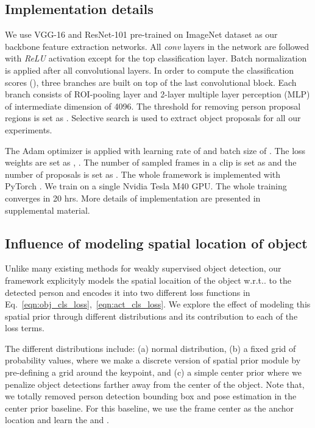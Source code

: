 \documentclass[10pt,twocolumn,letterpaper]{article}
\makeatletter
\DeclareRobustCommand\onedot{\futurelet\@let@token\@onedot}
\def\onedot{\ifx\@let@token.\else.\null\fi\xspace}
\def\wrt{w.r.t\onedot}
\makeatother
\begin{document}
\vspace{-0.4\baselineskip}
\subsection{Implementation details}
\vspace{-0.4\baselineskip}
We use VGG-16 and ResNet-101 pre-trained on ImageNet dataset as our backbone feature extraction networks. All \textit{conv} layers in the network are followed with \textit{ReLU} activation except for the top classification layer. Batch normalization \cite{ioffe2015batch} is applied after all convolutional layers. In order to compute the classification scores (), three branches are built on top of the last convolutional block. Each branch consists of ROI-pooling layer and 2-layer multiple layer perception (MLP) of intermediate dimension of 4096. The threshold for removing person proposal regions is set as . Selective search \cite{uijlings2013selective} is used to extract object proposals for all our experiments.




The Adam optimizer \cite{kingma2014adam} is applied with learning rate of  and batch size of . The loss weights are set as , .
The number of sampled frames in a clip is set as  and the number of proposals is set as . The whole framework is implemented with PyTorch \cite{paszke2017automatic}. We train on a single Nvidia Tesla M40 GPU. The whole training converges in 20 hrs. More details of implementation are presented in supplemental material.


\vspace{-0.3\baselineskip}
\subsection{Influence of modeling spatial location of object}
\vspace{-0.4\baselineskip}
\label{sec:ablation}

Unlike many existing methods for weakly supervised object detection, our framework explicityly models the spatial locaition of the object \wrt to the detected person and encodes it into two different loss functions in Eq.~\ref{eqn:obj_cls_loss},~\ref{eqn:act_cls_loss}. We explore the effect of modeling this spatial prior through different distributions and its contribution to each of the loss terms.

The different distributions include:  (a) normal distribution, (b) a fixed grid of probability values, where we make a discrete version of spatial prior module by pre-defining a  grid around the keypoint, and (c) a simple center prior where we penalize object detections farther away from the center of the object. Note that, we totally removed person detection bounding box and pose estimation in the center prior baseline. For this baseline, we use the frame center as the anchor location  and learn the  and .
\end{document}
